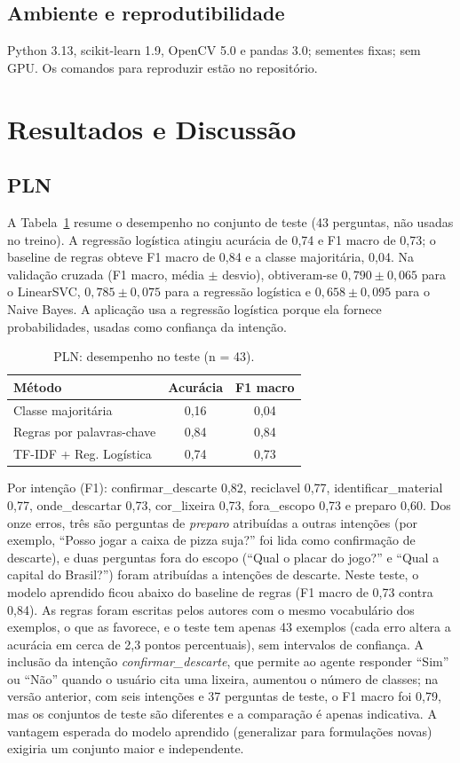 \documentclass[conference]{IEEEtran}
\begin{document}
\subsection{Ambiente e reprodutibilidade}
Python 3.13, scikit-learn 1.9, OpenCV 5.0 e pandas 3.0; sementes fixas; sem GPU. Os comandos para reproduzir estão no repositório.

\section{Resultados e Discussão}
\subsection{PLN}
A Tabela~\ref{tab:pln} resume o desempenho no conjunto de teste (43 perguntas, não usadas no treino). A regressão logística atingiu acurácia de 0,74 e F1 macro de 0,73; o baseline de regras obteve F1 macro de 0,84 e a classe majoritária, 0,04. Na validação cruzada (F1 macro, média $\pm$ desvio), obtiveram-se $0{,}790\pm0{,}065$ para o LinearSVC, $0{,}785\pm0{,}075$ para a regressão logística e $0{,}658\pm0{,}095$ para o Naive Bayes. A aplicação usa a regressão logística porque ela fornece probabilidades, usadas como confiança da intenção.

\begin{table}[t]
\caption{PLN: desempenho no teste (n = 43).}\label{tab:pln}\centering
\begin{tabular}{lcc}\toprule
Método & Acurácia & F1 macro\\\midrule
Classe majoritária & 0,16 & 0,04\\
Regras por palavras-chave & 0,84 & 0,84\\
TF-IDF + Reg. Logística & 0,74 & 0,73\\\bottomrule
\end{tabular}
\end{table}

Por intenção (F1): confirmar\_descarte 0,82, reciclavel 0,77, identificar\_material 0,77, onde\_descartar 0,73, cor\_lixeira 0,73, fora\_escopo 0,73 e preparo 0,60. Dos onze erros, três são perguntas de \emph{preparo} atribuídas a outras intenções (por exemplo, ``Posso jogar a caixa de pizza suja?'' foi lida como confirmação de descarte), e duas perguntas fora do escopo (``Qual o placar do jogo?'' e ``Qual a capital do Brasil?'') foram atribuídas a intenções de descarte. Neste teste, o modelo aprendido ficou abaixo do baseline de regras (F1 macro de 0,73 contra 0,84). As regras foram escritas pelos autores com o mesmo vocabulário dos exemplos, o que as favorece, e o teste tem apenas 43 exemplos (cada erro altera a acurácia em cerca de 2,3 pontos percentuais), sem intervalos de confiança. A inclusão da intenção \emph{confirmar\_descarte}, que permite ao agente responder ``Sim'' ou ``Não'' quando o usuário cita uma lixeira, aumentou o número de classes; na versão anterior, com seis intenções e 37 perguntas de teste, o F1 macro foi 0,79, mas os conjuntos de teste são diferentes e a comparação é apenas indicativa. A vantagem esperada do modelo aprendido (generalizar para formulações novas) exigiria um conjunto maior e independente.
\end{document}
